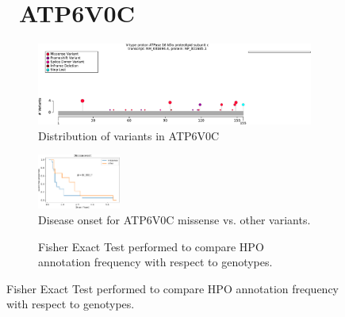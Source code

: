 \begin{figure}[htbp]
\section*{ ATP6V0C}
\centering
\begin{subfigure}[b]{0.95\textwidth}
\centering
\includegraphics[width=\textwidth]{ img/ATP6V0C_protein_diagram.pdf} 
\captionsetup{justification=raggedright,singlelinecheck=false}
\caption{Distribution of variants in ATP6V0C}
\end{subfigure}

\vspace{2em}

\begin{subfigure}[b]{0.95\textwidth}
\centering
\includegraphics[width=0.3\textwidth]{ img/ATP6V0C_stats.pdf} 
\captionsetup{justification=raggedright,singlelinecheck=false}
\caption{Disease onset for  ATP6V0C missense vs. other variants.}
\end{subfigure}

\vspace{2em}

\begin{subfigure}[b]{0.95\textwidth}
\centering
{}
\captionsetup{justification=raggedright,singlelinecheck=false}
\caption{Fisher Exact Test performed to compare HPO annotation frequency with respect to genotypes. }
\end{subfigure}


\end{figure}
